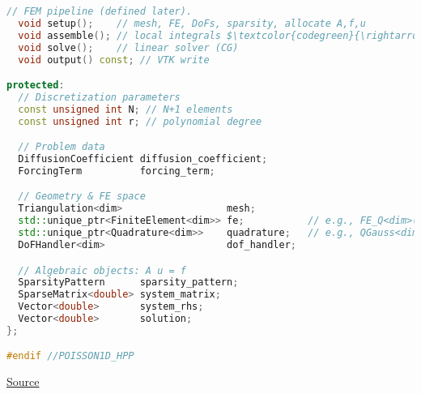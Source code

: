 \begin{lstlisting}[language=C++,mathescape=true]
  // FEM pipeline (defined later).
  void setup();    // mesh, FE, DoFs, sparsity, allocate A,f,u
  void assemble(); // local integrals $\textcolor{codegreen}{\rightarrow}$ global A,f and apply Dirichlet
  void solve();    // linear solver (CG)
  void output() const; // VTK write

protected:
  // Discretization parameters
  const unsigned int N; // N+1 elements
  const unsigned int r; // polynomial degree

  // Problem data
  DiffusionCoefficient diffusion_coefficient;
  ForcingTerm          forcing_term;

  // Geometry & FE space
  Triangulation<dim>                  mesh;
  std::unique_ptr<FiniteElement<dim>> fe;           // e.g., FE_Q<dim>(r)
  std::unique_ptr<Quadrature<dim>>    quadrature;   // e.g., QGauss<dim>(r+1)
  DoFHandler<dim>                     dof_handler;

  // Algebraic objects: A u = f
  SparsityPattern      sparsity_pattern;
  SparseMatrix<double> system_matrix;
  Vector<double>       system_rhs;
  Vector<double>       solution;
};

#endif //POISSON1D_HPP\end{lstlisting}

\begin{center}
    \href{https://gist.github.com/AndreVale69/f04f312da68d16c253f46493ae7eaf24}{ Source}
    \hspace{1em}
\end{center}

